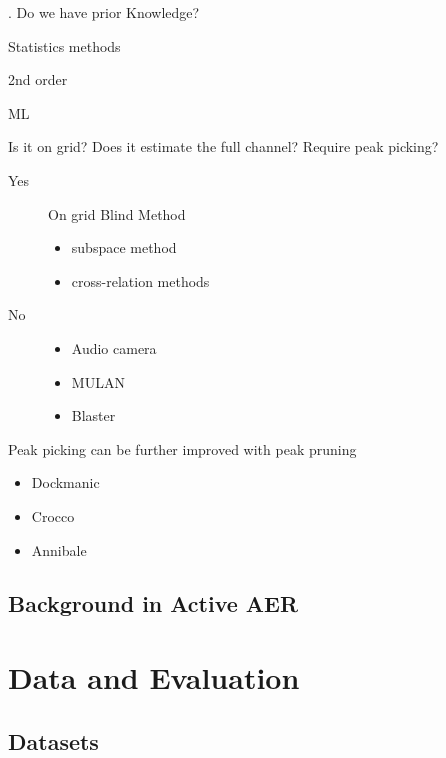 \begin{description}
\begin{itemize}
    \end{itemize}
    \item[No]. Do we have prior Knowledge?
    \begin{description}
        \item[Yes] Statistics methods
            \item 2nd order
            \item ML
        \item[No] Is it on grid? Does it estimate the full channel? Require peak picking?
            \begin{description}
                \item[Yes] On grid Blind Method
                    \begin{itemize}
                    \item subspace method
                    \item cross-relation methods
                    \end{itemize}
                \item[No]
                \begin{itemize}
                    \item Audio camera
                    \item MULAN
                    \item Blaster
                \end{itemize}
            \end{description}
    \end{description}
\end{description}



Peak picking can be further improved with peak pruning
\begin{itemize}
    \item Dockmanic
    \item Crocco
    \item Annibale
\end{itemize}


\subsection{Background in Active AER}

\section{Data and Evaluation}

\subsection{Datasets}


